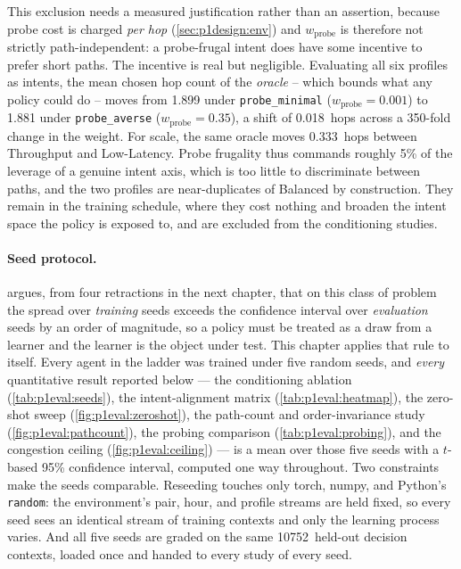 This exclusion needs a measured justification rather than an assertion, because probe cost is charged
\emph{per hop} (\cref{sec:p1design:env}) and $w_{\text{probe}}$ is therefore not strictly
path-independent: a probe-frugal intent does have some incentive to prefer short paths. The incentive is
real but negligible. Evaluating all six profiles as intents, the mean chosen hop count of the
\emph{oracle} -- which bounds what any policy could do -- moves from 1.899 under \texttt{probe\_minimal}
($w_{\text{probe}} = 0.001$) to 1.881 under \texttt{probe\_averse} ($w_{\text{probe}} = 0.35$), a shift
of 0.018~hops across a 350-fold change in the weight. For scale, the same oracle moves 0.333~hops between
Throughput and Low-Latency. Probe frugality thus commands roughly 5\% of the leverage of a genuine intent
axis, which is too little to discriminate between paths, and the two profiles are near-duplicates of
Balanced by construction. They remain in the training schedule, where they cost nothing and broaden the
intent space the policy is exposed to, and are excluded from the conditioning studies.

\paragraph{Seed protocol.}  argues, from four retractions in the next chapter,
that on this class of problem the spread over \emph{training} seeds exceeds the confidence interval
over \emph{evaluation} seeds by an order of magnitude, so a policy must be treated as a draw from a
learner and the learner is the object under test. This chapter applies that rule to itself. Every
agent in the ladder was trained under five random seeds, and \emph{every} quantitative result reported
below --- the conditioning ablation (\cref{tab:p1eval:seeds}), the intent-alignment matrix
(\cref{tab:p1eval:heatmap}), the zero-shot sweep (\cref{fig:p1eval:zeroshot}), the path-count and
order-invariance study (\cref{fig:p1eval:pathcount}), the probing comparison
(\cref{tab:p1eval:probing}), and the congestion ceiling (\cref{fig:p1eval:ceiling}) --- is a mean over
those five seeds with a $t$-based 95\% confidence interval, computed one way throughout. Two
constraints make the seeds comparable. Reseeding touches only torch, numpy, and Python's \texttt{random}:
the environment's pair, hour, and profile streams are held fixed, so every seed sees an identical stream
of training contexts and only the learning process varies. And all five seeds are graded on the same
10752~held-out decision contexts, loaded once and handed to every study of every seed.

